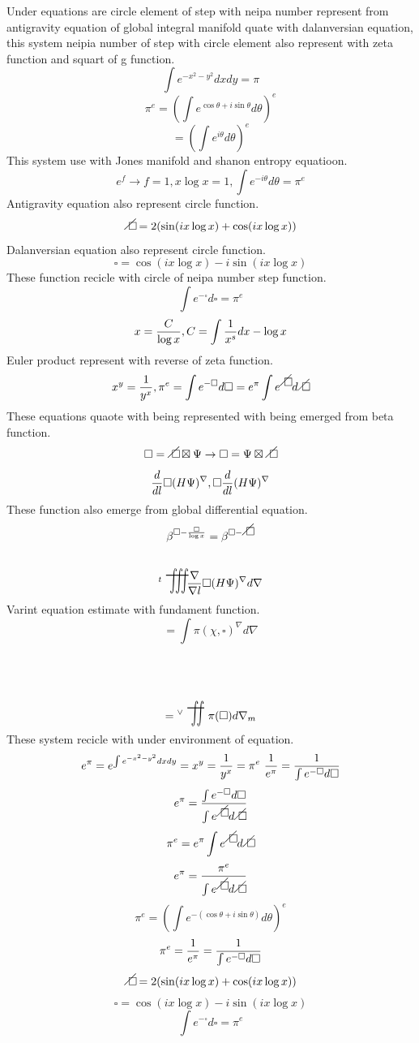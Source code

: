 \documentclass{jsarticle}
\begin{document}
 Under equations are circle element of step with neipa number represent
 from antigravity equation of global integral manifold quate with
 dalanversian equation, this system neipia number of step with circle
 element also represent with zeta function and squart of g function.
   $$ \int {e^{-x^2 -y^2}}dxdy = \pi $$
   $$ \pi^{e} = (\int e^{\cos \theta + i\sin \theta}d\theta)^{e} $$
   $$ = (\int e^{i\theta}d\theta)^{e} $$
 This system use with Jones manifold and shanon entropy equatioon.
   $$ e^{f} \to f=1, x\log x=1, \int e^{-i\theta}d\theta = \pi^{e} $$
 Antigravity equation also represent circle function.
    $$\alearletter = 2(\sin(ix\log x) + \cos(ix\log x))$$
    Dalanversian equation also represent circle function.
    $$ \square = \cos(ix \log x) - i\sin(ix\log x)$$
    These function recicle with circle of neipa number step function.
    $$ \int e^{-\square}d\square = \pi^{e} $$
    $$ x = {C \over {\log x}}, C = \int{1 \over {x^s}}dx - \log x $$
   Euler product represent with reverse of zeta function. 
   $$ x^y = {1 \over {y^x}}, \pi^{e} = \int e^{-\square}d\square
   = e^{\pi}\int e^{\alearletter}d\alearletter $$
   These equations quaote with being represented with being emerged
   from beta function.
   $$ \square = \alearletter \boxtimes \Psi \to \square = \Psi 
   \boxtimes \alearletter $$
   $$ {d \over {d l}}\square(H\Psi)^{\nabla}, \square{d \over
   {d l}}(H\Psi)^{\nabla} $$
   These function also emerge from global differential equation.
   $$ \beta^{\square -{{\square \over {\log x}}}} =
   \beta^{\square - \alearletter} $$
    $${}^{t}\scalebox{1}[2]{\variiint}
    {\nabla \over {\nabla l}}\square(H\Psi)^{\nabla}
    d\nabla $$
    Varint equation estimate with fundament function. 
    $$ = \int \pi(\chi,\square)^{\nabla}d\nabla $$
    $$ = {}^{\vee}\scalebox{1}[2]{\variint} \pi(\square)d\nabla_m $$
    These system recicle with under environment of equation.
    $$ e^{\pi} = e^{\int e^{-x^2 -y^2}dxdy} = x^y = {1 \over {y^x}}
    = \pi^{e} ~ {1 \over {e^{\pi}}} = {1 \over {\int e^{-\square}d
    \square}} $$
    $$ e^{\pi} = {{\int e^{-\square}d\square} \over {{\int
    e^{\alearletter}d\alearletter}}} $$
    $$ \pi^{e} = e^{\pi} \int e^{\alearletter}d\alearletter $$
    $$ e^{\pi} = {\pi^{e} \over {{\int e^{\alearletter}d\alearletter}}} $$
    $$ \pi^{e} = (\int e^{-(\cos \theta + i\sin \theta)}d\theta)^{e} $$
    $$ \pi^{e} = {1 \over {e^{\pi}}} = {1 \over {{\int e^{-\square}
    d\square}}} $$
    $$ \alearletter = 2(\sin(ix \log x) + \cos(ix \log x)) $$ 
    $$ \square = \cos(ix \log x) - i\sin(ix\log x) $$
    $$ \int e^{-\square}d\square = \pi^{e} $$
\end{document}
